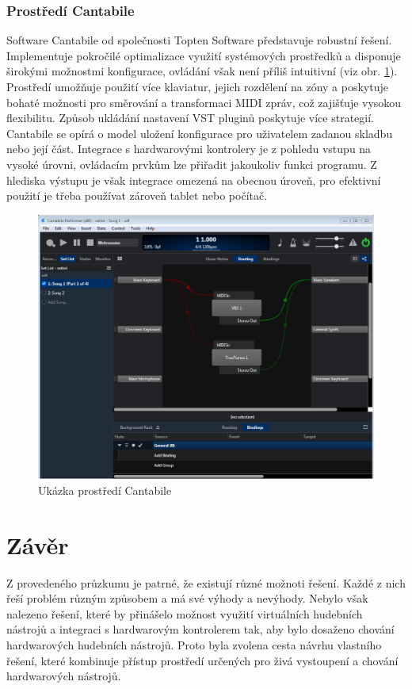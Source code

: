 \documentclass[thesis=M,czech]{FITthesis}[2019/03/06]
\begin{document}
			\subsubsection{Prostředí Cantabile}
				Software Cantabile od společnosti Topten Software představuje robustní řešení.
				Implementuje pokročilé optimalizace využití systémových prostředků a
				disponuje širokými možnostmi konfigurace, ovládání však není příliš intuitivní (viz obr. \ref{fig:Cantabile}).
				Prostředí umožňuje použití více klaviatur, jejich rozdělení na zóny a poskytuje bohaté možnosti
				pro směrování a transformaci MIDI zpráv, což zajišťuje vysokou flexibilitu.
				Způsob ukládání nastavení VST pluginů poskytuje více strategií.
				Cantabile se opírá o model uložení konfigurace pro uživatelem zadanou skladbu nebo její část.
				Integrace s hardwarovými kontrolery je z pohledu vstupu na vysoké úrovni, ovládacím prvkům lze přiřadit jakoukoliv 
				funkci programu. Z hlediska výstupu je však integrace omezená na obecnou úroveň, pro efektivní použití
				je třeba používat zároveň tablet nebo počítač.
				\begin{figure}[H]
					\centering
					\includegraphics[width=1\textwidth]{Cantabile}
					\caption{Ukázka prostředí Cantabile}\label{fig:Cantabile}
				\end{figure}
		
	\section{Závěr}
		Z provedeného průzkumu je patrné, že existují různé možnoti řešení. Každé z nich řeší problém různým způsobem a má své výhody a nevýhody.
		Nebylo však nalezeno řešení, které by přinášelo možnost využití virtuálních hudebních nástrojů a integraci s hardwarovým kontrolerem tak,
		aby bylo dosaženo chování hardwarových hudebních nástrojů. Proto byla zvolena cesta návrhu vlastního řešení, které kombinuje přístup
		prostředí určených pro živá vystoupení a chování hardwarových nástrojů.
\end{document}
